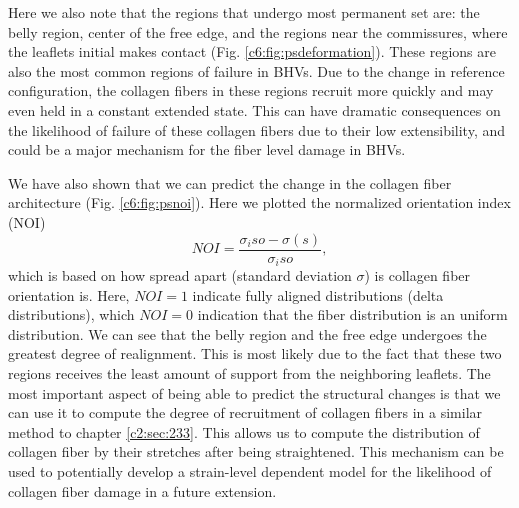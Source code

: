     
    Here we also note that the regions that undergo most permanent set are: the belly region, center of the free edge, and the regions near the commissures, where the leaflets initial makes contact (Fig. \ref{c6:fig:psdeformation}). These regions are also the most common regions of failure in BHVs. Due to the change in reference configuration, the collagen fibers in these regions recruit more quickly and may even held in a constant extended state. This can have dramatic consequences on the likelihood of failure of these collagen fibers due to their low extensibility, and could be a major mechanism for the fiber level damage in BHVs. 
    
    
    We have also shown that we can predict the change in the collagen fiber architecture (Fig. \ref{c6:fig:psnoi}). Here we plotted the normalized orientation index (NOI)
    \begin{equation}
        NOI = \frac{\sigma_iso - \sigma(s)}{\sigma_iso},
    \end{equation}
    which is based on how spread apart (standard deviation $\sigma$) is collagen fiber orientation is. Here, $NOI = 1$ indicate fully aligned distributions (delta distributions), which $NOI = 0$ indication that the fiber distribution is an uniform distribution. We can see that the belly region and the free edge undergoes the greatest degree of realignment. This is most likely due to the fact that these two regions receives the least amount of support from the neighboring leaflets. The most important aspect of being able to predict the structural changes is that we can use it to compute the degree of recruitment of collagen fibers in a similar method to chapter \ref{c2:sec:233}. This allows us to compute the distribution of collagen fiber by their stretches after being straightened. This mechanism can be used to potentially develop a strain-level dependent model for the likelihood of collagen fiber damage in a future extension. 

